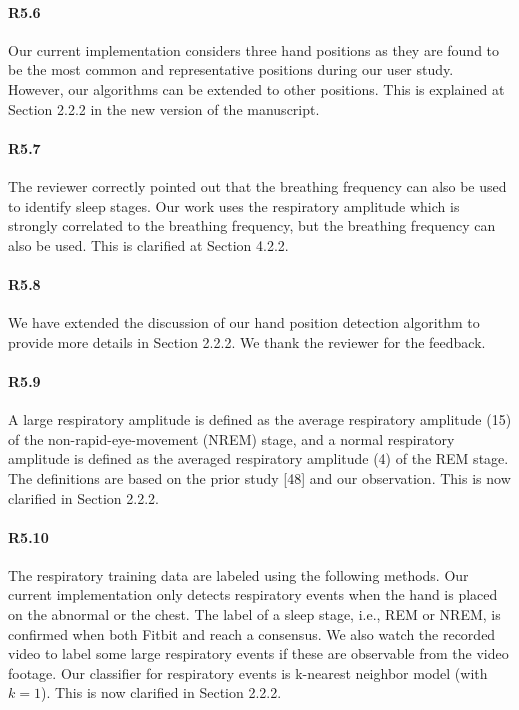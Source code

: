 \paragraph{R5.6} Our current implementation considers three hand positions as they are found to be the most common and representative
positions during our user study. However, our algorithms can be extended to other positions. This is explained at Section 2.2.2 in the new
version of the manuscript.

\paragraph{R5.7} The reviewer correctly pointed out that the breathing frequency can also be used to identify sleep stages. Our work uses
the respiratory amplitude which is strongly correlated to the breathing frequency, but the breathing frequency can also be used. This is
clarified at Section 4.2.2.

\paragraph{R5.8} We have extended the discussion of our hand position detection algorithm to provide more details in Section 2.2.2. We
thank the reviewer for the feedback.

\paragraph{R5.9} A large respiratory amplitude is defined as the average respiratory amplitude (15) of the
non-rapid-eye-movement (NREM) stage, and a normal respiratory amplitude is defined as the averaged respiratory amplitude (4) of the REM
stage. The definitions are based on the prior study [48] and our observation. This is now clarified in Section 2.2.2.


\paragraph{R5.10} The respiratory training data are labeled using the following methods. Our current implementation only detects
respiratory events when the hand is placed on the abnormal or the chest. The label of a sleep stage, i.e., REM or NREM, is confirmed when
both Fitbit and \systemname reach a consensus. We also watch the recorded video to label some large respiratory events if these are
observable from the video footage. Our classifier for respiratory events is k-nearest neighbor model (with $k=1$). This is now clarified in
Section 2.2.2.


